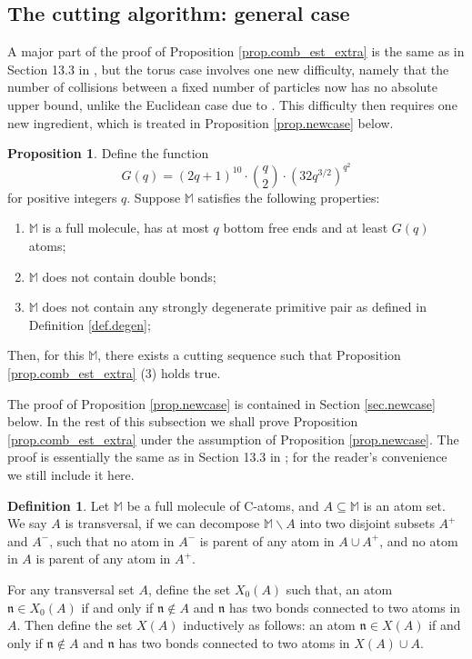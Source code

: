 \documentclass[10pt, reqno]{amsart}
\newcommand{\Mb}{\mathbb M}
\newcommand{\nf}{\mathfrak n}
\theoremstyle{definition}
\newtheorem{proposition}[theorem]{Proposition}
\newtheorem{definition}[theorem]{Definition}
\theoremstyle{remark}
\numberwithin{equation}{section}
\begin{document}
\subsection{The cutting algorithm: general case}\label{sec.cutting_final}
A major part of the proof of Proposition \ref{prop.comb_est_extra} is the same as in Section 13.3 in \cite{DHM24}, but the torus case involves one new difficulty, namely that the number of collisions between a fixed number of particles now has no absolute upper bound, unlike the Euclidean case due to \cite{BFK98}. This difficulty then requires one new ingredient, which is treated in Proposition \ref{prop.newcase} below.
\begin{proposition}\label{prop.comb_est_extra_2} Define the function 
\begin{equation}\label{defG}G(q)=(2q+1)^{10}\cdot\binom{q}{2}\cdot (32q^{3/2})^{q^2}\end{equation} for positive integers $q$. Suppose $\Mb$ satisfies the following properties:
\begin{enumerate}
\item $\Mb$ is a full molecule, has at most $q$ bottom free ends and at least $G(q)$ atoms;
\item $\Mb$ does not contain double bonds;
\item $\Mb$ does not contain any strongly degenerate primitive pair as defined in Definition \ref{def.degen};
\end{enumerate}
Then, for this $\Mb$, there exists a cutting sequence such that Proposition \ref{prop.comb_est_extra} (3) holds true.
\label{prop.newcase}
\end{proposition}
The proof of Proposition \ref{prop.newcase} is contained in Section \ref{sec.newcase} below. In the rest of this subsection we shall prove Proposition \ref{prop.comb_est_extra} under the assumption of Proposition \ref{prop.newcase}. The proof is essentially the same as in Section 13.3 in \cite{DHM24}; for the reader's convenience we still include it here.
\begin{definition}
\label{def.trans} Let $\Mb$ be a full molecule of C-atoms, and $A\subseteq \Mb$ is an atom set. We say $A$ is transversal, if we can decompose $\Mb\backslash A$ into two disjoint subsets $A^+$ and $A^-$, such that no atom in $A^-$ is parent of any atom in $A\cup A^+$, and no atom in $A$ is parent of any atom in $A^+$.

For any transversal set $A$, define the set $X_0(A)$  such that, an atom $\nf\in X_0(A)$ if and only if $\nf\not\in A$ and $\nf$ has two bonds connected to two atoms in  $A$. Then define the set $X(A)$ inductively as follows: an atom $\nf\in X(A)$ if and only if $\nf\not\in A$ and $\nf$ has two bonds connected to two atoms in $X(A)\cup A$.
\end{definition}
\end{document}
